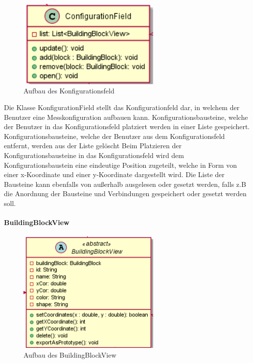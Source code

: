 \documentclass[parskip=full]{scrartcl}
\begin{document}
\begin{figure}[htbp]
	\begin{center}
		\includegraphics[width = 7cm]{Grafiken/View/ConfigurationField.png}
		\caption{Aufbau des Konfigurationsfeld}
		\label{Entwurf_Grob}
	\end{center}
\end{figure}

Die Klasse KonfigurationField stellt das Konfigurationfeld dar, in welchem der Benutzer eine Messkonfiguration aufbauen kann.
Konfigurationsbausteine, welche der Benutzer in das Konfigurationsfeld platziert werden in einer Liste gespeichert. 
Konfigurationsbausteine, welche der Benutzer aus dem Konfigurationsfeld entfernt, werden aus der Liste gelöscht
Beim Platzieren der Konfigurationsbausteine in das Konfigurationsfeld wird dem Konfigurationsbaustein eine eindeutige Position zugeteilt, welche in Form von einer x-Koordinate und einer y-Koordinate dargestellt wird.
Die Liste der Bausteine kann ebenfalls von außerhalb ausgelesen oder gesetzt werden, falls z.B die Anordnung der Bausteine und Verbindungen gespeichert oder gesetzt werden soll.

\paragraph{BuildingBlockView}

\begin{figure}[htbp]
	\begin{center}
		\includegraphics[width = 7cm]{Grafiken/View/BuildingBlockView.png}
		\caption{Aufbau des BuildingBlockView}
		\label{Entwurf_Grob}
	\end{center}
\end{figure}
\end{document}
